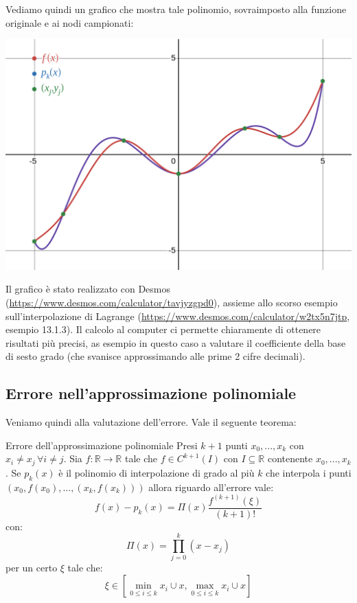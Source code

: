 \documentclass[a4paper,11pt]{article}
\begin{document}
\begin{minipage}{\textwidth}
Vediamo quindi un grafico che mostra tale polinomio, sovraimposto alla funzione originale e ai nodi campionati:

\begin{center}
	\includegraphics[scale=0.3]{../figures/newton_interpol.png}
\end{center}
\end{minipage}

\par\bigskip

Il grafico è stato realizzato con Desmos (\url{https://www.desmos.com/calculator/tavjyzgpd0}), assieme allo scorso esempio sull'interpolazione di Lagrange (\url{https://www.desmos.com/calculator/w2tx5n7jtp}, esempio 13.1.3).
Il calcolo al computer ci permette chiaramente di ottenere risultati più precisi, as esempio in questo caso a valutare il coefficiente della base di sesto grado (che svanisce approssimando alle prime 2 cifre decimali). 

\subsection{Errore nell'approssimazione polinomiale}
Veniamo quindi alla valutazione dell'errore.
Vale il seguente teorema:
\begin{theorem}{Errore dell'approssimazione polinomiale}
	Presi $k + 1$ punti $x_0, ..., x_k$ con $x_i \neq x_j \, \forall i \neq j$.
	Sia $f: \mathbb{R} \rightarrow \mathbb{R}$ tale che $f \in C^{k + 1}(I)$ con $I \subseteq \mathbb{R}$ contenente $x_0, ..., x_k$.
	Se $p_k(x)$ è il polinomio di interpolazione di grado al più $k$ che interpola i punti $(x_0, f(x_0), ..., (x_k, f(x_k)))$ allora riguardo all'errore vale:
$$
f(x) - p_k(x) = \Pi(x) \frac{f^{(k + 1)}(\xi)}{(k + 1)!}
$$
con:
$$
\Pi(x) = \prod_{j = 0}^k (x - x_j)
$$
per un certo $\xi$ tale che:
$$
\xi \in \left[ \min_{0 \leq i \leq k} x_i \cup x, \max_{0 \leq i \leq k} x_i \cup x \right]
$$
\end{theorem}
\end{document}
